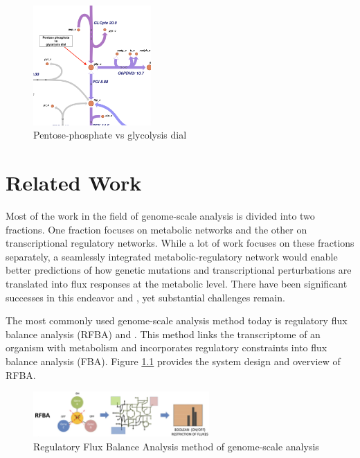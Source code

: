 \documentclass[12pt,chapterheads]{ucsd}
\begin{document}
\begin{figure}[h] 
\centering
\includegraphics[width=0.4\textwidth]{dial_2}
\caption[Pentose-phosphate vs glycolysis dial]
{Pentose-phosphate vs glycolysis dial }
\label{fig:dial_2}
\end{figure}


\chapter{Related Work} \label{chap:related_work}

Most of the work in the field of genome-scale analysis is divided into two fractions. One fraction focuses on metabolic networks and the other on transcriptional regulatory networks.
While a lot of work focuses on these fractions separately, a seamlessly integrated metabolic-regulatory network would enable better predictions of how genetic mutations and transcriptional perturbations are translated into flux responses at the metabolic level. There have been significant successes in this endeavor \cite{Covert2004} and \cite{Herrgård2006}, yet substantial challenges remain. 

The most commonly used genome-scale analysis method today is regulatory flux balance analysis (RFBA) \cite{Covert2004} and \cite{COVERT200173}. This method links the transcriptome of an organism with metabolism and 
incorporates regulatory constraints into flux balance analysis (FBA).
Figure \ref{fig:rfba} provides the system design and overview of RFBA.
\begin{figure}[h] 
\centering
\includegraphics[width=0.6\textwidth]{rfba}
\caption[Regulatory Flux Balance Analysis method of genome-scale analysis]
{Regulatory Flux Balance Analysis method of genome-scale analysis}
\label{fig:rfba}
\end{figure}
\end{document}
